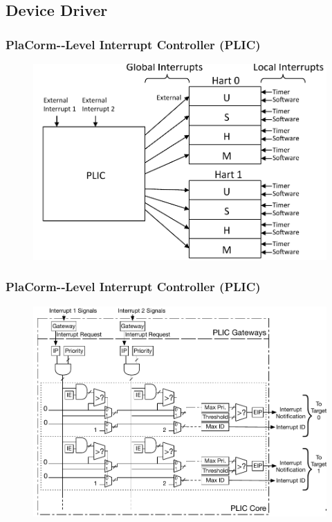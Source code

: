 \subsection{Device Driver} %
\begin{frame}[fragile]
    \frametitle{PlaCorm-­‐Level	 Interrupt	 Controller	 (PLIC)	 }
    \begin{figure}
    \includegraphics[width=0.7\linewidth]{figs/rv-plic.png}
    \end{figure}
\end{frame}

\begin{frame}[fragile]
    \frametitle{PlaCorm-­‐Level	 Interrupt	 Controller	 (PLIC)	 }
    \begin{figure}
        \includegraphics[width=0.6\linewidth]{figs/rv-plic-detail.png}
    \end{figure}
\end{frame}

